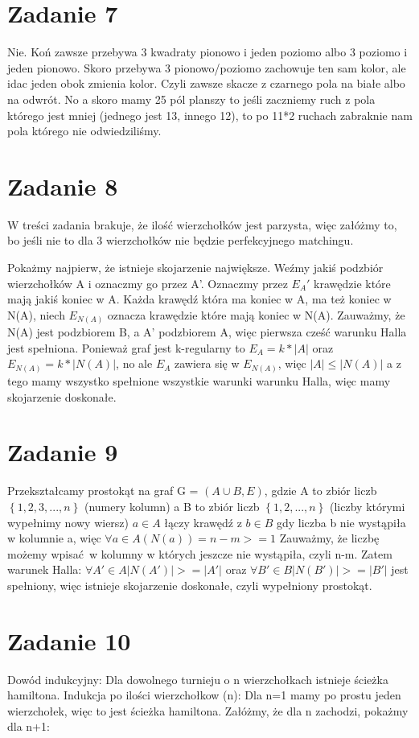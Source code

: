 \documentclass[12pt]{article}
\newcommand{\set}[1]{\left \{ #1 \right \}}				%
\begin{document}
\section{Zadanie 7} %
Nie.
Koń zawsze przebywa 3 kwadraty pionowo i jeden poziomo albo 3 poziomo i jeden pionowo. Skoro przebywa 3 pionowo/poziomo zachowuje ten sam kolor, ale idac jeden obok zmienia kolor. Czyli zawsze skacze z czarnego pola na białe albo na odwrót. No a skoro mamy 25 pól planszy to jeśli zaczniemy ruch z pola którego jest mniej (jednego jest 13, innego 12), to po 11*2 ruchach zabraknie nam pola którego nie odwiedziliśmy.
\section{Zadanie 8} %
W treści zadania brakuje, że ilość wierzchołków jest parzysta, więc załóżmy to, bo jeśli nie to dla 3 wierzchołków nie będzie perfekcyjnego matchingu.

Pokażmy najpierw, że istnieje skojarzenie największe.
Weźmy jakiś podzbiór wierzchołków A i oznaczmy go przez A'. Oznaczmy przez $E_A'$ krawędzie które mają jakiś koniec w A. Każda krawędź która ma koniec w A, ma też koniec w N(A), niech $E_{N(A)}$ oznacza krawędzie które mają koniec w N(A). Zauważmy, że N(A) jest podzbiorem B, a A' podzbiorem A, więc pierwsza cześć warunku Halla jest spełniona. 
Ponieważ graf jest k-regularny to $E_A = k*|A|$ oraz $E_{N(A)} = k*|N(A)|$, no ale $E_A$ zawiera się w $E_{N(A)}$, więc $|A| \leq |N(A)|$ a z tego mamy wszystko spełnione wszystkie warunki warunku Halla, więc mamy skojarzenie doskonałe.
\section{Zadanie 9} %

Przekształcamy prostokąt na graf G = $(A \cup B, E)$, 
gdzie A to zbiór liczb $\set{1, 2, 3, ..., n}$ (numery kolumn)
a B to zbiór liczb $\set{1,2,...,n}$ (liczby którymi wypełnimy nowy wiersz)
$a \in A$ łączy krawędź z $b \in B$ gdy liczba b nie wystąpiła w kolumnie a, więc 
$\forall a \in A (N(a)) = n-m >= 1$
Zauważmy, że liczbę możemy wpisać w kolumny w których jeszcze nie wystąpiła, czyli n-m.
Zatem warunek Halla:
$\forall A' \in A |N(A')| >= |A'|$ oraz $\forall B' \in B |N(B')| >= |B'|$
jest spełniony, więc istnieje skojarzenie doskonałe, czyli wypełniony prostokąt.

\section{Zadanie 10} %
Dowód indukcyjny: Dla dowolnego turnieju o n wierzchołkach istnieje ścieżka hamiltona.
Indukcja po ilości wierzchołkow (n): 
Dla n=1 mamy po prostu jeden wierzchołek, więc to jest ścieżka hamiltona.
Załóżmy, że dla n zachodzi, pokażmy dla n+1:
\end{document}
